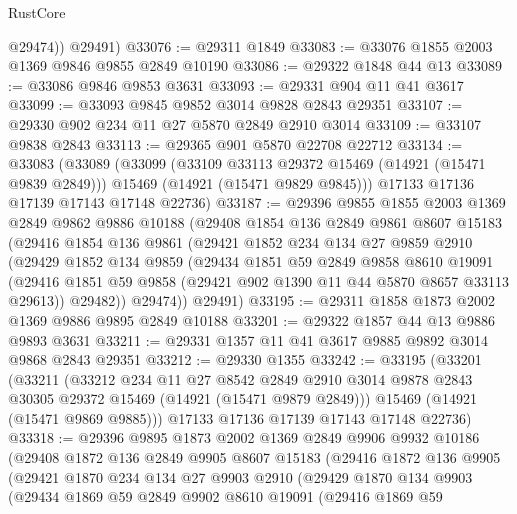 \begin{lexlean}{RustCore}
\begin{coremodule}
          @29474))
      @29491)
@33076 := @29311 @1849
@33083 := @33076 @1855 @2003 @1369 @9846 @9855 @2849 @10190
@33086 := @29322 @1848 @44 @13
@33089 := @33086 @9846 @9853 @3631
@33093 := @29331 @904 @11 @41 @3617
@33099 := @33093 @9845 @9852 @3014 @9828 @2843 @29351
@33107 := @29330 @902 @234 @11 @27 @5870 @2849 @2910 @3014
@33109 := @33107 @9838 @2843
@33113 := @29365 @901 @5870 @22708 @22712
@33134 := @33083
    (@33089
      (@33099
        (@33109 @33113 @29372 @15469 (@14921 (@15471 @9839 @2849)))
        @15469
        (@14921 (@15471 @9829 @9845)))
      @17133
      @17136
      @17139
      @17143
      @17148
      @22736)
@33187 := @29396
    @9855
    @1855
    @2003
    @1369
    @2849
    @9862
    @9886
    @10188
    (@29408
      @1854
      @136
      @2849
      @9861
      @8607
      @15183
      (@29416
        @1854
        @136
        @9861
        (@29421
          @1852
          @234
          @134
          @27
          @9859
          @2910
          (@29429
            @1852
            @134
            @9859
            (@29434
              @1851
              @59
              @2849
              @9858
              @8610
              @19091
              (@29416 @1851 @59 @9858 (@29421 @902 @1390 @11 @44 @5870 @8657 @33113 @29613))
              @29482))
          @29474))
      @29491)
@33195 := @29311 @1858 @1873 @2002 @1369 @9886 @9895 @2849 @10188
@33201 := @29322 @1857 @44 @13 @9886 @9893 @3631
@33211 := @29331 @1357 @11 @41 @3617 @9885 @9892 @3014 @9868 @2843 @29351
@33212 := @29330 @1355
@33242 := @33195
    (@33201
      (@33211
        (@33212
          @234
          @11
          @27
          @8542
          @2849
          @2910
          @3014
          @9878
          @2843
          @30305
          @29372
          @15469
          (@14921 (@15471 @9879 @2849)))
        @15469
        (@14921 (@15471 @9869 @9885)))
      @17133
      @17136
      @17139
      @17143
      @17148
      @22736)
@33318 := @29396
    @9895
    @1873
    @2002
    @1369
    @2849
    @9906
    @9932
    @10186
    (@29408
      @1872
      @136
      @2849
      @9905
      @8607
      @15183
      (@29416
        @1872
        @136
        @9905
        (@29421
          @1870
          @234
          @134
          @27
          @9903
          @2910
          (@29429
            @1870
            @134
            @9903
            (@29434
              @1869
              @59
              @2849
              @9902
              @8610
              @19091
              (@29416
                @1869
                @59

\end{coremodule}
\end{lexlean}
